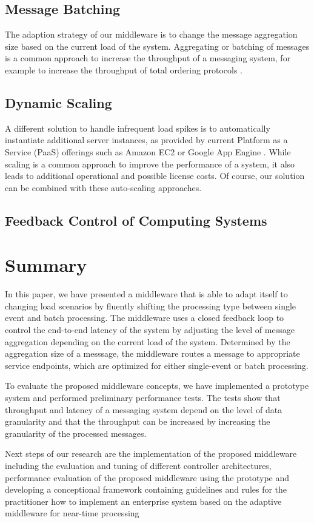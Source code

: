 \subsection{Message Batching}
The adaption strategy of our middleware is to change the message aggregation size based on the current load of the system. Aggregating or batching of messages is a common approach to increase the throughput of a messaging system, for example to increase the throughput of total ordering protocols \citep{Friedman:1997aa} \citep{Friedman:2006aa} \citep{Romano:2012aa} \citep{Didona:2012aa}.


\subsection{Dynamic Scaling}
A different solution to handle infrequent load spikes is to automatically instantiate additional server instances, as provided by current Platform as a Service (PaaS) offerings such as Amazon EC2 \citep{ec2_autoscaling} or Google App Engine \citep{google_cloud_autoscaling}. While scaling is a common approach to improve the performance of a system, it also leads to additional operational and possible license costs. Of course, our solution can be combined with these auto-scaling approaches.

\subsection{Feedback Control of Computing Systems}

\section{Summary}\label{sec:ch5_summary}
In this paper, we have presented a middleware that is able to adapt itself to changing load scenarios by fluently shifting the processing type between single event and batch processing. The middleware uses a closed feedback loop to control the end-to-end latency of the system by adjusting the level of message aggregation depending on the current load of the system. Determined by the aggregation size of a messsage, the middleware routes a message to appropriate service endpoints, which are optimized for either single-event or batch processing.

To evaluate the proposed middleware concepts, we have implemented a prototype system and performed preliminary performance tests. The tests show that throughput and latency of a messaging system depend on the level of data granularity and that the throughput can be increased by increasing the granularity of the processed messages.

Next steps of our research are the implementation of the proposed middleware including the evaluation and tuning of different controller architectures, performance evaluation of the proposed middleware using the prototype and developing a conceptional framework containing guidelines and rules for the practitioner how to implement an enterprise system based on the adaptive middleware for near-time processing
